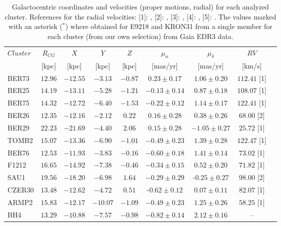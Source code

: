 \documentclass[referee]{aa}
\begin{document}
\begin{appendix}
  \begin{table}
  \caption{Galactocentric coordinates and velocities (proper motions, radial)
  for each analyzed cluster. References for the radial velocities: [1]: 
  \cite{Tarricq_2021}, [2]: \cite{Dias_2002}, [3]: \cite{Soubiran_2018}, [4]: 
  \cite{Dias_2007}, [5]: \cite{Frinchaboy_2006}. The values marked with an
  asterisk ($^*$) where obtained for E9218 and KRON31 from a single member for
  each cluster (from our own selection) from Gaia EDR3 data.}
  \label{tab:velocities}
  \centering
  \renewcommand{\arraystretch}{1.3}
  \begin{tabular}{lcccccccc}
   \hline \hline
   $Cluster$ & $R_{CG}$ & $X$ & $Y$ & $Z$ & $\mu_{\alpha}$ & $\mu_{\delta}$ & $RV$\\
    & [kpc] & [kpc] & [kpc] & [kpc] & [mas/yr] & [mas/yr] & [km/s]\\
   \hline
   BER73 & $12.96$ & $-12.55$ & $-3.13$ & $-0.87$ & $ 0.23 \pm 0.17$ & $ 1.06 \pm 0.20$ & $112.41$ [1] \\
   BER25 & $14.19$ & $-13.11$ & $-5.28$ & $-1.21$ & $- 0.13 \pm 0.14$ & $ 0.87 \pm 0.18$ & $108.07$ [1] \\
   BER75 & $14.32$ & $-12.72$ & $-6.40$ & $-1.53$ & $- 0.22 \pm 0.12$ & $ 1.14 \pm 0.17$ & $122.41$ [1] \\
   BER26 & $12.35$ & $-12.16$ & $-2.12$ & $0.22$ & $ 0.16 \pm 0.28$ & $ 0.38 \pm 0.26$ & $68.00$ [2]\\
   BER29 & $22.23$ & $-21.69$ & $-4.40$ & $2.06$ & $ 0.15 \pm 0.28$ & $- 1.05 \pm 0.27$ & $25.72$ [1]\\
   TOMB2 & $15.07$ & $-13.36$ & $-6.90$ & $-1.01$ & $- 0.49 \pm 0.23$ & $ 1.39 \pm 0.28$ & $122.47$ [1]\\
   BER76 & $12.53$ & $-11.93$ & $-3.83$ & $-0.16$ & $- 0.60 \pm 0.18$ & $ 1.41 \pm 0.14$ & $73.02$ [1]\\
   F1212 & $16.65$ & $-14.92$ & $-7.38$ & $-0.46$ & $- 0.34 \pm 0.15$ & $ 0.52 \pm 0.20$ & $71.82$ [1]\\
   SAU1 & $19.56$ & $-18.20$ & $-6.98$ & $1.64$ & $- 0.29 \pm 0.29$ & -$ 0.25 \pm 0.27$ & $98.00$ [2]\\
   CZER30 & $13.48$ & $-12.62$ & $-4.72$ & $0.51$ & -$ 0.62 \pm 0.12$ & $ 0.07 \pm 0.11$ & $82.07$ [1]\\
   ARMP2 & $15.83$ & $-12.17$ & $-10.07$ & $-1.09$ & $- 0.49 \pm 0.23$ & $ 1.25 \pm 0.26$ & $58.25$ [1]\\
   BH4 & $13.29$ & $-10.88$ & $-7.57$ & $-0.98$ & $- 0.82 \pm 0.14$ & $ 2.12 \pm 0.16$ & -- \\

\end{tabular}
\end{table}
\end{appendix}
\end{document}

